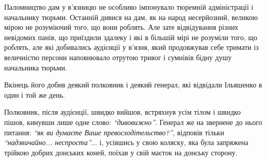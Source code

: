\documentclass[a4paper,20pt]{report}
\begin{document}
Паломництво дам у в'язницю не особливо імпонувало тюремній адміністрації і начальнику
тюрьми. Останній дивися на дам, як на народ несерйозний, великою мірою не розуміючий
того, що вони роблять. Але зате відвідування різних невідомих панів, що приїздили здалеку
і які в більшій мірі не розуміли того, що роблять, але які добивались аудієнції у в'язня,
який продовжував себе тримати із величністю персони наповнювало отрутою тривог і сумнівів
бідну душу начальника тюрьми.

Вкінець його добив деякий полковник і деякий генерал, які відвідали Ільяшенко в один і той же
день.

Полковник, після аудієнції, швидко вийшов, встряхнув усім тілом і швидко пішов,
кинувши лише одне слово: \emph{``дивовижно''}. Генерал же на звернене до нього
питання: \emph{``як ви думаєте Ваше превосходітельство?''}, відповів тільки
\emph{``надзвичайно... неспроста''}... і, усівшись у свою коляску, яка була
запряжена трійкою добрих донських коней, поїхав у свій маєток на донську
сторону.
\end{document}

